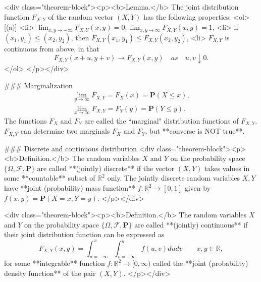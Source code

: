 <div class="theorem-block"><p><b>Lemma.</b> 
The joint distribution function $F_{X, Y}$ of the random vector $(X, Y)$ has the following properties: 
<ol>[(a)]
    <li> $\lim_{x, y\to -\infty} F_{X, Y}(x, y) = 0, \lim_{x,y\to\infty} F_{X, Y}(x,y) = 1$,
    <li> if $(x_1, y_1) \leq (x_2, y_2)$, then $F_{X,Y}(x_1, y_1) \leq F_{X, Y}(x_2, y_2)$,
    <li> $F_{X,Y}$ is continuous from above, in that 
    $$\begin{equation}
        F_{X,Y}(x+u, y+v) \to F_{X,Y}(x,y) \quad as \quad u, v \downarrow 0.
    \end{equation}$$
</ol>
</p></div>

### Marginalization 
\begin{gather*}
    \lim_{y\to\infty} F_{X,Y} = F_X(x) = \mathbf{P}(X \leq x), \\
    \lim_{x\to\infty} F_{X,Y} = F_Y(y) = \mathbf{P}(Y \leq y).
\end{gather*}
The functions $F_X$ and $F_Y$ are called the ``marginal" distribution functions of $F_{X,Y}$. $F_{X,Y}$ can determine two marginals $F_X$ and $F_Y$, but **converse is NOT true**.

### Discrete and continuous distribution
<div class="theorem-block"><p><b>Definition.</b> 
The random variables $X$ and $Y$ on the probability space $\{ \Omega, \mathcal{F}, \mathbf{P} \}$ are called **(jointly) discrete** if the vector $(X, Y)$ takes values in some **countable** subset of $\mathbb{R}^2$ only. The jointly discrete random variables $X, Y$ have **joint (probability) mass function** $f : \mathbb{R}^2 \to [0,1]$ given by $f(x, y) = \mathbf{P}(X = x, Y = y)$. 
</p></div>

<div class="theorem-block"><p><b>Definition.</b> 
The random variables $X$ and $Y$ on the probability space $\{ \Omega, \mathcal{F}, \mathbf{P} \}$ are called **(jointly) continuous** if their joint distribution function can be expressed as 
$$\begin{equation}
    F_{X,Y}(x,y) = \int_{u = -\infty}^x \int_{v = -\infty}^y f(u,v)du dv \qquad x, y\in\mathbb{R},
\end{equation}$$
for some **integrable** function $f : \mathbb{R}^2 \to [0, \infty)$ called the **joint (probability) density function** of the pair $(X, Y)$. 
</p></div>

